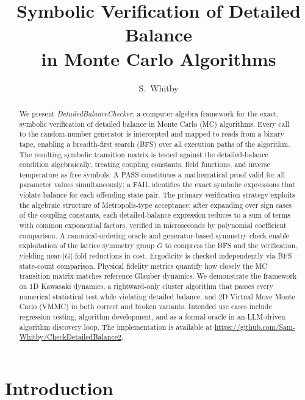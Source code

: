 \documentclass[twocolumn,10pt]{article}
\title{\textbf{Symbolic Verification of Detailed Balance\\[-2pt] in Monte Carlo Algorithms}}
\author{S.~Whitby}
\date{}
\newcommand{\DBC}{\textit{DetailedBalanceChecker}}
\begin{document}
\maketitle
\thispagestyle{empty}

\begin{abstract}
\noindent
We present \DBC{}, a computer-algebra framework for the exact, symbolic
verification of detailed balance in Monte Carlo (MC) algorithms.  Every call
to the random-number generator is intercepted and mapped to reads from a
binary tape, enabling a breadth-first search (BFS) over all execution paths
of the algorithm.  The resulting symbolic transition matrix is tested against
the detailed-balance condition algebraically, treating coupling constants,
field functions, and inverse temperature as free symbols.  A PASS constitutes
a mathematical proof valid for all parameter values simultaneously; a FAIL
identifies the exact symbolic expressions that violate balance for each
offending state pair.  The primary verification strategy exploits the
algebraic structure of Metropolis-type acceptance: after expanding over sign
cases of the coupling constants, each detailed-balance expression reduces to
a sum of terms with common exponential factors, verified in microseconds by
polynomial coefficient comparison.  A canonical-ordering oracle and
generator-based symmetry check enable exploitation of the lattice symmetry
group $G$ to compress the BFS and the verification, yielding near-$|G|$-fold
reductions in cost.  Ergodicity is checked independently via BFS state-count
comparison.  Physical fidelity metrics quantify how closely the MC transition
matrix matches reference Glauber dynamics.  We demonstrate the framework on
1D Kawasaki dynamics, a rightward-only cluster algorithm that passes every
numerical statistical test while violating detailed balance, and 2D Virtual
Move Monte Carlo (VMMC) in both correct and broken variants.  Intended use
cases include regression testing, algorithm development, and as a formal
oracle in an LLM-driven algorithm discovery loop.  The implementation is
available at \url{https://github.com/Sam-Whitby/CheckDetailedBalance2}.
\end{abstract}

\section{Introduction}
\end{document}
